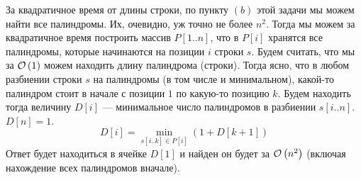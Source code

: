 \begin{enumerate}[label=(\alph*)]
	За квадратичное время от длины строки, по пункту $(b)$ этой задачи мы можем найти все палиндромы. Их, очевидно,
	уж точно не более $n^2$. Тогда мы можем за квадратичное время построить массив $P[1..n]$, что в $P[i]$ хранятся
	все палиндромы, которые начинаются на позиции $i$ строки $s$. Будем считать, что мы за $\mathcal{O}\left(1\right)$ можем находить длину палиндрома (строки). Тогда ясно, что в любом разбиении строки $s$ на палиндромы (в том числе и минимальном),
	какой-то палиндром стоит в начале с позиции $1$ по какую-то позицию $k$. Будем находить тогда величину $D[i]$
	--- минимальное число палиндромов в разбиении $s[i..n]$. $D[n] = 1$.
	\[
		D[i] = \min_{s[i..k] \in P[i]}{\left( 1 + D[k + 1] \right)}
	\] 
	Ответ будет находиться в ячейке $D[1]$ и найден он будет за $\mathcal{O}\left(n^2\right)$ (включая нахождение всех палиндромов вначале). \xqed
\end{enumerate}
